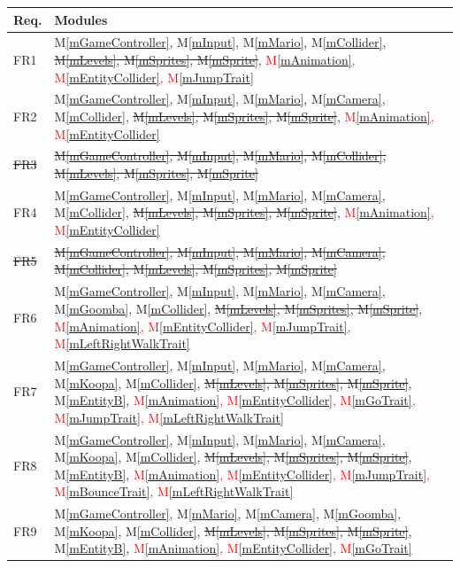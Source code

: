 \documentclass[12pt, titlepage]{article}
\newcommand{\mref}[1]{M\ref{#1}}
\begin{document}
\begin{table}[H]
\centering
\begin{tabular}{p{} p{}}
\toprule
\textbf{Req.} & \textbf{Modules}\\
\midrule
FR1 & \mref{mGameController}, \mref{mInput}, \mref{mMario}, \mref{mCollider}, \sout{\mref{mLevels}, \mref{mSprites}, \mref{mSprite}}, \textcolor{red}{\mref{mAnimation}, \mref{mEntityCollider}, \mref{mJumpTrait}}\\
FR2 & \mref{mGameController}, \mref{mInput}, \mref{mMario}, \mref{mCamera}, \mref{mCollider}, \sout{\mref{mLevels}, \mref{mSprites}, \mref{mSprite}}, \textcolor{red}{\mref{mAnimation}, \mref{mEntityCollider}}\\
\sout{FR3} & \sout{\mref{mGameController}, \mref{mInput}, \mref{mMario}, \mref{mCollider}, \mref{mLevels}, \mref{mSprites}, \mref{mSprite}}\\
FR4 & \mref{mGameController}, \mref{mInput}, \mref{mMario}, \mref{mCamera}, \mref{mCollider}, \sout{\mref{mLevels}, \mref{mSprites}, \mref{mSprite}}, \textcolor{red}{ \mref{mAnimation}, \mref{mEntityCollider}}\\
\sout{FR5} & \sout{\mref{mGameController}, \mref{mInput}, \mref{mMario}, \mref{mCamera}, \mref{mCollider}, \mref{mLevels}, \mref{mSprites}, \mref{mSprite}}\\
FR6 & \mref{mGameController}, \mref{mInput}, \mref{mMario}, \mref{mCamera}, \mref{mGoomba}, \mref{mCollider}, \sout{\mref{mLevels}, \mref{mSprites}, \mref{mSprite}}, \textcolor{red}{ \mref{mAnimation}, \mref{mEntityCollider}, \mref{mJumpTrait}, \mref{mLeftRightWalkTrait}}\\
FR7 & \mref{mGameController}, \mref{mInput}, \mref{mMario}, \mref{mCamera}, \mref{mKoopa}, \mref{mCollider}, \sout{\mref{mLevels}, \mref{mSprites}, \mref{mSprite}}, \mref{mEntityB}, \textcolor{red}{\mref{mAnimation}, \mref{mEntityCollider}, \mref{mGoTrait}, \mref{mJumpTrait}, \mref{mLeftRightWalkTrait}}\\
FR8 & \mref{mGameController}, \mref{mInput}, \mref{mMario}, \mref{mCamera}, \mref{mKoopa}, \mref{mCollider}, \sout{\mref{mLevels}, \mref{mSprites}, \mref{mSprite}}, \mref{mEntityB}, \textcolor{red}{\mref{mAnimation}, \mref{mEntityCollider}, \mref{mJumpTrait}, \mref{mBounceTrait}, \mref{mLeftRightWalkTrait}}\\
FR9 & \mref{mGameController}, \mref{mMario}, \mref{mCamera}, \mref{mGoomba}, \mref{mKoopa}, \mref{mCollider}, \sout{\mref{mLevels}, \mref{mSprites}, \mref{mSprite}}, \mref{mEntityB}, \textcolor{red}{\mref{mAnimation}, \mref{mEntityCollider}, \mref{mGoTrait}}\\

\end{tabular}
\end{table}
\end{document}
